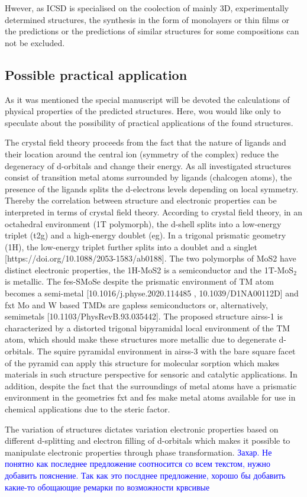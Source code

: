 \documentclass[a4paperm]{article}
\begin{document}
Hwever, as ICSD is specialised on the coolection of mainly 3D, experimentally determined structures, the synthesis in the form of monolayers or thin films or the predictions or the predictions of similar structures for some compositions can not be excluded.



\subsection{Possible practical application}

As it was mentioned the special manuscript will be devoted the calculations of physical properties of the predicted structures.
Here, wou would like only to speculate about the possibility of practical applications of the found structures.

The crystal field theory proceeds from the fact that the nature of ligands and their location around the central ion (symmetry of the complex) reduce the degeneracy of d-orbitals and change their energy. As all investigated structures consist of transition metal atoms surrounded by ligands (chalcogen atoms), the presence of the ligands splits the d-electrons levels depending on local symmetry. Thereby the correlation between structure and electronic properties can be interpreted in terms of crystal field theory. According to crystal field theory, in an octahedral environment (1T polymorph), the d-shell splits into a low-energy triplet (t2g) and a high-energy doublet (eg). In a trigonal prismatic geometry (1H), the low-energy triplet further splits into a doublet and a singlet [https://doi.org/10.1088/2053-1583/ab0188]. The two polymorphs of MoS2 have distinct electronic properties, the 1H-MoS2 is a semiconductor and the 1T-MoS$_2$ is metallic. The fes-SMoSe despite the prismatic environment of TM atom becomes a semi-metal [10.1016/j.physe.2020.114485 , 10.1039/D1NA00112D] and fxt Mo and W based TMDs are gapless semiconductors or, alternatively, semimetals [10.1103/PhysRevB.93.035442]. The proposed structure airss-1 is characterized by a distorted trigonal bipyramidal local environment of the TM atom, which should make these structures more metallic due to degenerate d-orbitals. The squire pyramidal environment in airss-3 with the bare square facet of the pyramid can apply this structure for molecular sorption which makes materials in such structure perspective for sensoric and catalytic applications. In addition, despite the fact that the surroundings of metal atoms have a prismatic environment in the geometries fxt and fes make metal atoms available for use in chemical applications due to the steric factor.

The variation of structures dictates variation electronic properties based on different d-splitting and electron filling of d-orbitals which makes it possible to manipulate electronic properties through phase transformation.
\textcolor{blue}{Захар. Не понятно как последнее предложение соотносится со всем текстом, нужно добавить пояснение. Так как это послднее предложение, хорошо бы добавить какие-то обощающие ремарки по возможности крвсивые}




\end{document}
